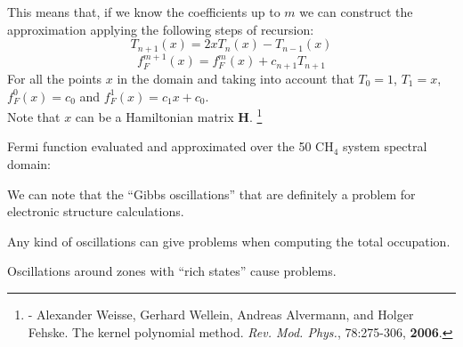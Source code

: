   This means that, if we know the coefficients up to $m$ we can construct the approximation applying the following steps of recursion: 
\begin{equation}
    T_{n+1}(x) = 2xT_n(x) - T_{n-1}(x) 
\end{equation}
\begin{equation}
    f^{m+1}_F(x) = f^m_F(x) + c_{n+1}T_{n+1}
\end{equation}
For all the points $x$ in the domain and taking into account that $T_0 = 1$, $T_1=x$, $f^0_F(x) = c_0$ and $f^1_F(x) = c_1x + c_0$. \\
\vspace{0.4cm}
Note that $x$ can be a Hamiltonian matrix $\textbf{H}$.
  \footnote{\tiny
    - Alexander Weisse, Gerhard Wellein, Andreas Alvermann, and Holger Fehske. The kernel polynomial method. \textit{Rev. Mod. Phys.}, 78:275-306, \textbf{2006}. 
  }


Fermi function evaluated and approximated over the 50 CH$_4$ system spectral domain:
   \begin{center}
   \end{center}  
We can note that the ``Gibbs oscillations'' that are definitely a problem for electronic structure calculations. 


Any kind of oscillations can give problems when computing the total occupation.
   \begin{center}
   \end{center}  
Oscillations around zones with ``rich states'' cause problems.



